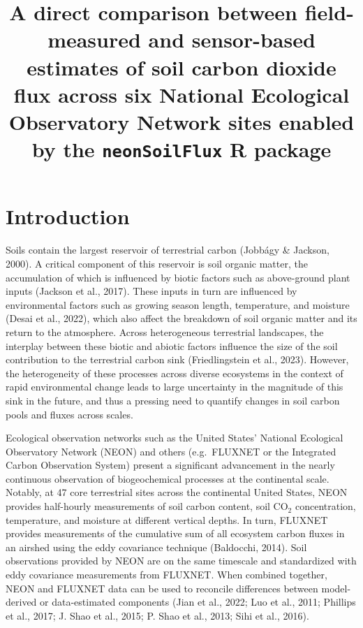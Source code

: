 \documentclass[
  letterpaper,
  DIV=11,
  numbers=noendperiod]{scrartcl}
\title{A direct comparison between field-measured and sensor-based
estimates of soil carbon dioxide flux across six National Ecological
Observatory Network sites enabled by the \texttt{neonSoilFlux} R
package}
\author{}
\date{}
\begin{document}
\maketitle


\section{Introduction}\label{introduction}

Soils contain the largest reservoir of terrestrial carbon (Jobbágy \&
Jackson, 2000). A critical component of this reservoir is soil organic
matter, the accumulation of which is influenced by biotic factors such
as above-ground plant inputs (Jackson et al., 2017). These inputs in
turn are influenced by environmental factors such as growing season
length, temperature, and moisture (Desai et al., 2022), which also
affect the breakdown of soil organic matter and its return to the
atmosphere. Across heterogeneous terrestrial landscapes, the interplay
between these biotic and abiotic factors influence the size of the soil
contribution to the terrestrial carbon sink (Friedlingstein et al.,
2023). However, the heterogeneity of these processes across diverse
ecosystems in the context of rapid environmental change leads to large
uncertainty in the magnitude of this sink in the future, and thus a
pressing need to quantify changes in soil carbon pools and fluxes across
scales.

Ecological observation networks such as the United States' National
Ecological Observatory Network (NEON) and others (e.g.~FLUXNET or the
Integrated Carbon Observation System) present a significant advancement
in the nearly continuous observation of biogeochemical processes at the
continental scale. Notably, at 47 core terrestrial sites across the
continental United States, NEON provides half-hourly measurements of
soil carbon content, soil CO\(_{2}\) concentration, temperature, and
moisture at different vertical depths. In turn, FLUXNET provides
measurements of the cumulative sum of all ecosystem carbon fluxes in an
airshed using the eddy covariance technique (Baldocchi, 2014). Soil
observations provided by NEON are on the same timescale and standardized
with eddy covariance measurements from FLUXNET. When combined together,
NEON and FLUXNET data can be used to reconcile differences between
model-derived or data-estimated components (Jian et al., 2022; Luo et
al., 2011; Phillips et al., 2017; J. Shao et al., 2015; P. Shao et al.,
2013; Sihi et al., 2016).
\end{document}
